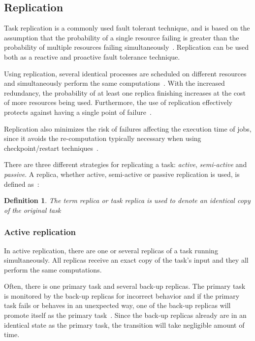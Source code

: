 \documentclass{cslthse-msc}
\newtheorem{definition}{Definition}[chapter]
\begin{document}
\subsection{Replication} \label{subsec:background_replication}
Task replication is a commonly used fault tolerant technique, and is based on the assumption that the probability of a single resource failing is greater than the probability of multiple resources failing simultaneously~\cite{faultToleranceGrid}. Replication can be used both as a reactive and proactive fault tolerance technique. %

Using replication, several identical processes are scheduled on different resources and simultaneously perform the same computations~\cite{relGridSystems}. With the increased redundancy, the probability of at least one replica finishing increases at the cost of more resources being used. Furthermore, the use of replication effectively protects against having a single point of failure~\cite{faultToleranceGrid}.

Replication also minimizes the risk of failures affecting the execution time of jobs, since it avoids the re-computation typically necessary when using checkpoint/restart techniques~\cite{designFaultTolerantSched}.

There are three different strategies for replicating a task: \emph{active}, \emph{semi-active} and \emph{passive}. A replica, whether active, semi-active or passive replication is used, is defined as~\cite{effTaskReplMobGrid}:
\begin{definition} \label{def:replica}
The term replica or task replica is used to denote an identical copy of the original task
\end{definition}

\subsubsection{Active replication} \label{subsec:active_replication}
In active replication, there are one or several replicas of a task running simultaneously. All replicas receive an exact copy of the task's input and they all perform the same computations. 

Often, there is one primary task and several back-up replicas. The primary task is monitored by the back-up replicas for incorrect behavior and if the primary task fails or behaves in an unexpected way, one of the back-up replicas will promote itself as the primary task~\cite{surveyFaultParallel}. Since the back-up replicas already are in an identical state as the primary task, the transition will take negligible amount of time. 
\end{document}
